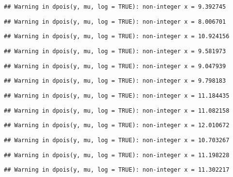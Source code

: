 \documentclass[
]{article}
\begin{document}
\begin{verbatim}
## Warning in dpois(y, mu, log = TRUE): non-integer x = 9.392745
\end{verbatim}

\begin{verbatim}
## Warning in dpois(y, mu, log = TRUE): non-integer x = 8.006701
\end{verbatim}

\begin{verbatim}
## Warning in dpois(y, mu, log = TRUE): non-integer x = 10.924156
\end{verbatim}

\begin{verbatim}
## Warning in dpois(y, mu, log = TRUE): non-integer x = 9.581973
\end{verbatim}

\begin{verbatim}
## Warning in dpois(y, mu, log = TRUE): non-integer x = 9.047939
\end{verbatim}

\begin{verbatim}
## Warning in dpois(y, mu, log = TRUE): non-integer x = 9.798183
\end{verbatim}

\begin{verbatim}
## Warning in dpois(y, mu, log = TRUE): non-integer x = 11.184435
\end{verbatim}

\begin{verbatim}
## Warning in dpois(y, mu, log = TRUE): non-integer x = 11.082158
\end{verbatim}

\begin{verbatim}
## Warning in dpois(y, mu, log = TRUE): non-integer x = 12.010672
\end{verbatim}

\begin{verbatim}
## Warning in dpois(y, mu, log = TRUE): non-integer x = 10.703267
\end{verbatim}

\begin{verbatim}
## Warning in dpois(y, mu, log = TRUE): non-integer x = 11.198228
\end{verbatim}

\begin{verbatim}
## Warning in dpois(y, mu, log = TRUE): non-integer x = 11.302217
\end{verbatim}
\end{document}
